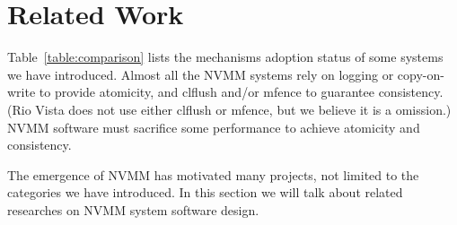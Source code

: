 \section{Related Work} 
\label{sec:related}

\begin{table}[hbtp]
	\vspace*{1mm}
	\caption{}
	\label{table:comparison}
\end{table}

Table~\ref{table:comparison} lists the mechanisms adoption status of some
systems we have introduced. Almost all the NVMM systems rely on logging or
copy-on-write to provide atomicity, and clflush and/or mfence to guarantee
consistency. (Rio Vista does not use either clflush or mfence, but we believe
it is a omission.) NVMM software must sacrifice some performance to achieve
atomicity and consistency.

The emergence of NVMM has motivated many projects, not limited to the categories
we have introduced. In this section we will talk about related researches
on NVMM system software design.

